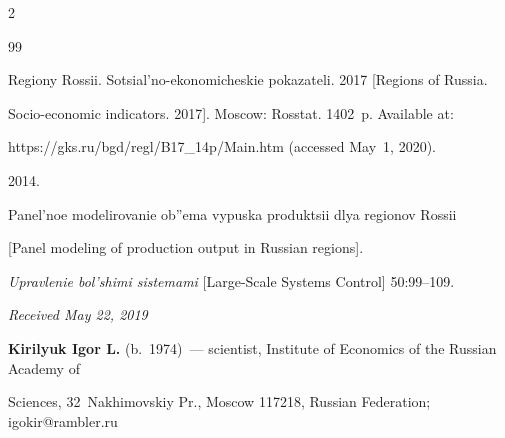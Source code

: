 \begin{multicols}{2}
{{\begin{thebibliography}{99}


Regiony Rossii. Sotsial'no-ekonomicheskie pokazateli. 2017 [Regions of Russia. 


Socio-economic indicators. 2017]. Moscow: Rosstat. 1402~p. Available at: 


{\sf https://gks.ru/bgd/regl/B17\_14p/Main.htm} (accessed May~1, 2020).




 2014. 


Panel'noe modelirovanie ob''ema vypuska produktsii dlya regionov Rossii 


[Panel modeling of production output in Russian regions]. 


\textit{Upravlenie bol'shimi sistemami} [Large-Scale Systems Control] 50:99--109.





\end{thebibliography}





 }


 }





\end{multicols}





\vspace*{-9pt}





\hfill{\small\textit{Received May 22, 2019}}















\Contr





\noindent


\textbf{Kirilyuk Igor L.} (b.\ 1974)~--- scientist, Institute of Economics of the Russian Academy of 


Sciences, 32~Nakhimovskiy Pr., Moscow 117218, Russian Federation; \mbox{igokir@rambler.ru}





